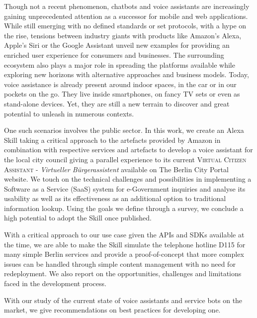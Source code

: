 Though not a recent phenomenon, chatbots and voice assistants are increasingly gaining unprecedented attention as a successor for mobile and web applications. While still emerging with no defined standards or set protocols, with a hype on the rise, tensions between industry giants with products like Amazon's Alexa, Apple's Siri or the Google Assistant %
unveil new examples for providing an enriched user experience for consumers and businesses. The surrounding ecosystem also plays a major role in spreading the platforms available while exploring new horizons with alternative approaches and business models. Today, voice assistance is already present around indoor spaces, in the car or in our pockets on the go. 
They live inside smartphones, on fancy TV sets or even as stand-alone devices. Yet, they are still a new terrain to discover and great potential to unleash in numerous contexts. 

One such scenarios involves the public sector. In this work, we create an Alexa Skill taking a critical approach to the artefacts provided by Amazon in combination with respective services and artefacts to develop a voice assistant for the local city council 
giving a parallel experience to its current \textsc{Virtual Citizen Assistant} - \textit{Virtueller Bürgerassistent} %
available on %
The Berlin City Portal website. We touch on the technical challenges and possibilities in implementing a Software as a Service (SaaS) system for e-Government inquiries and analyse its usability as well as its effectiveness as an additional option to traditional information lookup. Using the goals we define through a survey, we conclude a high potential to adopt the Skill once published.

With a critical approach to our use case %
given the APIs and SDKs available at the time, we are able to make the Skill simulate the telephone hotline D115 for many simple Berlin services and provide a proof-of-concept that more complex issues can be handled through simple content management with no need for redeployment. %
We also report on the opportunities, challenges and limitations faced in the development process.

With our study of the current state of voice assistants and service bots on the market, we give recommendations on best practices for developing one. %



